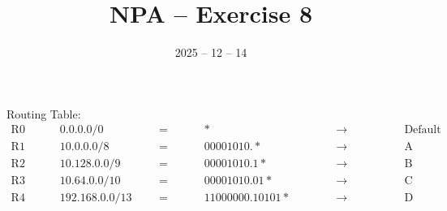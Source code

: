 \documentclass{article}
\date{2025 -- 12 -- 14}
\title{NPA -- Exercise 8}
\begin{document}
\maketitle
    
    \section{}
    \subsection{}

        \begin{center}
            Routing Table:
            \begin{align*}
            \text{R0} & ~~~ && 0.0.0.0/0 &&& = &&&& * &&&&& \to\ &&&&&& \text{Default} \\
            \text{R1} & ~ && 10.0.0.0/8 &&& = &&&& 00001010.* &&&&& \to\ &&&&&& \text{A} \\
            \text{R2} & ~ && 10.128.0.0/9 &&& = &&&& 00001010.1* &&&&& \to\ &&&&&& \text{B} \\
            \text{R3} & ~ && 10.64.0.0/10 &&& = &&&& 00001010.01* &&&&& \to\ &&&&&& \text{C} \\
            \text{R4} & ~ && 192.168.0.0/13 &&& = &&&& 11000000.10101* &&&&& \to\ &&&&&& \text{D} \\
            \end{align*}
        \end{center}
    
\end{document}
